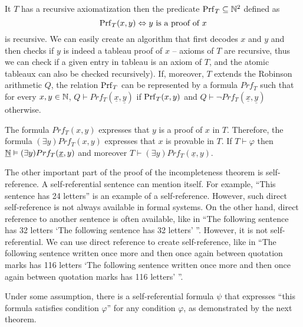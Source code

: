 It $T$ has a recursive axiomatization then the predicate $\operatorname{Prf}_T \subseteq \mathbb{N}^2$ defined as $$\operatorname{Prf}_T(x, y) \Leftrightarrow y \text{ is a proof of } x$$ is recursive. We can easily create an algorithm that first decodes $x$ and $y$ and then checks if $y$ is indeed a tableau proof of $x$ -- axioms of $T$ are recursive, thus we can check if a given entry in tableau is an axiom of $T$, and the atomic tableaux can also be checked recursively). If, moreover, $T$ extends the Robinson arithmetic $Q$, the relation $\operatorname{Prf}_T$ can be represented by a formula $Prf_T$ such that for every $x, y \in \mathbb{N}$, $Q \vdash Prf_T(\underline{x}, \underline{y})$ if $\operatorname{Prf}_T(x,y)$ and $Q \vdash \neg Prf_T(\underline{x}, \underline{y})$ otherwise.

The formula $Prf_T(x,y)$ expresses that $y$ is a proof of $x$ in $T$. Therefore, the formula $(\exists y)Prf_T(x, y)$ expresses that $x$ is provable in $T$. If $T \vdash \varphi$ then $\underline{\mathbb{N}} \vDash (\exists y)Prf_T(\underline{x}, y)$ and moreover $T \vdash (\exists y)Prf_T(\underline{x}, y)$.

The other important part of the proof of the incompleteness theorem is self-reference. A self-referential sentence can mention itself. For example, ``This sentence has 24 letters'' is an example of a self-reference. However, such direct self-reference is not always available in formal systems. On the other hand, direct reference to another sentence is often available, like in ``The following sentence has 32 letters `The following sentence has 32 letters' ''. However, it is not self-referential. We can use direct reference to create self-reference, like in ``The following sentence written once more and then once again between quotation marks has 116 letters `The following sentence written once more and then once again between quotation marks has 116 letters' ''.

Under some assumption, there is a self-referential formula $\psi$ that expresses ``this formula satisfies condition $\varphi$'' for any condition $\varphi$, as demonstrated by the next theorem.

